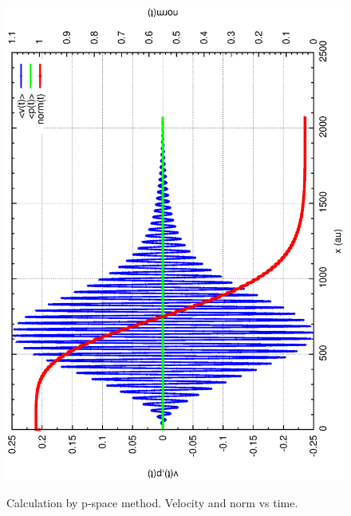 \documentclass{isildur}
\begin{document}
\begin{itemize}
\begin{figure}[htbp]
{{{\includegraphics[width=\linewidth]{fig3a.eps}} }}
\caption{ Calculation by p-space method. Velocity and norm vs time.
 }
\end{figure}
\begin{figure}[htbp]
\centering
\mbox{}
\end{figure}
\end{itemize}
\end{document}
